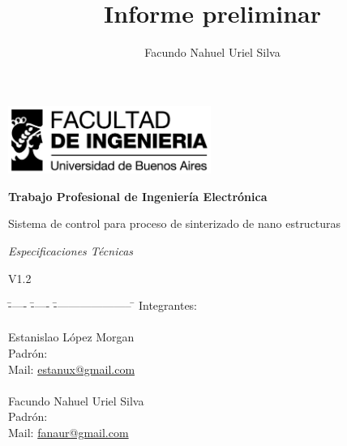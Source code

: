 \documentclass[12pt]{article}
\title{Informe preliminar}
\author{Facundo Nahuel Uriel Silva}
\begin{document}
  \newpage
  \thispagestyle{empty}
  
  \begin{center}
    \includegraphics[width=250px]{../logo_fiuba_alta.jpg} 

  \vspace{40px}

   {\bf \Large{Trabajo Profesional de Ingeniería Electrónica} }
  
  \vspace{30px}

  \huge{Sistema de control para proceso de sinterizado de nano estructuras }
  
  \vspace{40px}
  
  \huge{\textit{Especificaciones Técnicas} }
  
  \vspace{30px}
  \Large{ V1.2 }

  \end{center}

\vspace{100px}

   \begin{bf}
    \begin{Large}
      \begin{tabbing}
	\= ----- \= ----- \= --------------------- \= \kill
	\> Integrantes:\\
	\\
	  \>\> Estanislao López Morgan \\
	  \>\>\>  Padrón:	 \\
	  \>\>\>  Mail:	\>\url{estanux@gmail.com} \\
	\\
	  \>\> Facundo Nahuel Uriel Silva\\
	  \>\>\>  Padrón:	 \\
	  \>\>\>  Mail:	\> \url{fanaur@gmail.com}\\
      \end{tabbing}
    \end{Large}
  \end{bf}

\newpage
\thispagestyle{empty}
\vspace{80px}
\end{document}
